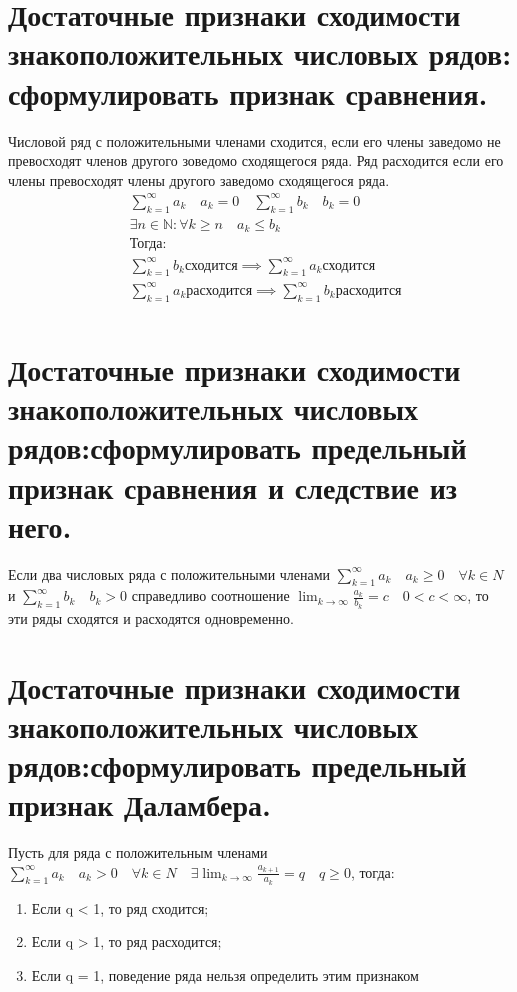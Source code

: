\documentclass[16pt]{extarticle}
\begin{document}
\section{Достаточные признаки сходимости знакоположительных числовых рядов: сформулировать признак сравнения.}
Числовой ряд с положительными членами сходится, если его члены заведомо не превосходят членов другого зоведомо сходящегося ряда. Ряд расходится если его члены превосходят члены другого заведомо сходящегося ряда.
\begin{equation}
\begin{aligned}
  &\sum_{k=1}^{\infty} a_k \quad a_k = 0 \quad \sum_{k=1}^{\infty} b_k \quad b_k = 0 \\
  &\exists n \in \mathbb{N} : \forall k \geq n \quad a_k \leq b_k \quad \\
  &\text{Тогда: } \\
  &\sum_{k=1}^{\infty} b_k \text{сходится} \implies \sum_{k=1}^{\infty} a_k \text{сходится} \\
  &\sum_{k=1}^{\infty} a_k \text{расходится} \implies \sum_{k=1}^{\infty} b_k \text{расходится} \\
\end{aligned}
\end{equation}
\section{Достаточные признаки сходимости знакоположительных числовых рядов:сформулировать предельный признак сравнения и следствие из него.}
Если два числовых ряда с положительными членами $\sum_{k=1}^{\infty} a_k \quad a_k  \geq 0 \quad \forall k \in N$ и $\sum_{k=1}^{\infty} b_k \quad b_k > 0$ справедливо соотношение $\lim_{k \to \infty} \frac{a_k}{b_k} = c \quad 0 < c < \infty $, то эти ряды сходятся и расходятся одновременно.
\section{Достаточные признаки сходимости знакоположительных числовых рядов:сформулировать предельный признак Даламбера.}
Пусть для ряда с положительным членами  $\sum_{k=1}^{\infty} a_k \quad a_k > 0 \quad \forall k \in N \quad \exists \lim_{k \to \infty} \frac{a_{k+1}}{a_k}  = q \quad q \geq 0 $, тогда:
\begin{enumerate}
\item Если q < 1, то ряд сходится;
\item Если q > 1, то ряд расходится;
\item Если q = 1, поведение ряда нельзя определить этим признаком
\end{enumerate}
\end{document}
